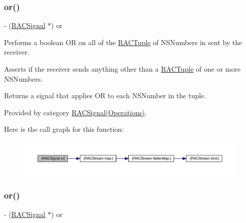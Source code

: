 \subsubsection{\texorpdfstring{or()}{or()}\hspace{0.1cm}{\footnotesize\ttfamily [2/3]}}
{\footnotesize\ttfamily -\/ (\mbox{\hyperlink{interface_r_a_c_signal}{R\+A\+C\+Signal}} $\ast$) or \begin{DoxyParamCaption}{ }\end{DoxyParamCaption}}

Performs a boolean OR on all of the \mbox{\hyperlink{interface_r_a_c_tuple}{R\+A\+C\+Tuple}} of N\+S\+Numbers in sent by the receiver.

Asserts if the receiver sends anything other than a \mbox{\hyperlink{interface_r_a_c_tuple}{R\+A\+C\+Tuple}} of one or more N\+S\+Numbers.

Returns a signal that applies OR to each N\+S\+Number in the tuple. 

Provided by category \mbox{\hyperlink{category_r_a_c_signal_07_operations_08_aaf19b8314c8e554a7e5140ebffcd4f98}{R\+A\+C\+Signal(\+Operations)}}.

Here is the call graph for this function\+:\nopagebreak
\begin{figure}[H]
\begin{center}
\leavevmode
\includegraphics[width=350pt]{interface_r_a_c_signal_aaf19b8314c8e554a7e5140ebffcd4f98_cgraph}
\end{center}
\end{figure}
\mbox{\label{interface_r_a_c_signal_aaf19b8314c8e554a7e5140ebffcd4f98}} 
\subsubsection{\texorpdfstring{or()}{or()}\hspace{0.1cm}{\footnotesize\ttfamily [3/3]}}
{\footnotesize\ttfamily -\/ (\mbox{\hyperlink{interface_r_a_c_signal}{R\+A\+C\+Signal}} $\ast$) or \begin{DoxyParamCaption}{ }\end{DoxyParamCaption}}

